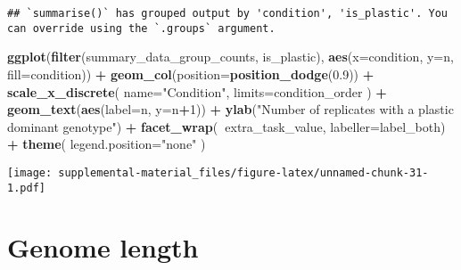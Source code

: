\documentclass[]{book}
\newenvironment{Shaded}{\begin{snugshade}}{\end{snugshade}}
\newcommand{\DataTypeTok}[1]{\textcolor[rgb]{0.13,0.29,0.53}{#1}}
\newcommand{\DecValTok}[1]{\textcolor[rgb]{0.00,0.00,0.81}{#1}}
\newcommand{\FloatTok}[1]{\textcolor[rgb]{0.00,0.00,0.81}{#1}}
\newcommand{\KeywordTok}[1]{\textcolor[rgb]{0.13,0.29,0.53}{\textbf{#1}}}
\newcommand{\NormalTok}[1]{#1}
\newcommand{\OperatorTok}[1]{\textcolor[rgb]{0.81,0.36,0.00}{\textbf{#1}}}
\newcommand{\StringTok}[1]{\textcolor[rgb]{0.31,0.60,0.02}{#1}}
\begin{document}
\begin{verbatim}
## `summarise()` has grouped output by 'condition', 'is_plastic'. You can override using the `.groups` argument.
\end{verbatim}

\begin{Shaded}
\begin{Highlighting}[]
\KeywordTok{ggplot}\NormalTok{(}\KeywordTok{filter}\NormalTok{(summary_data_group_counts, is_plastic), }\KeywordTok{aes}\NormalTok{(}\DataTypeTok{x=}\NormalTok{condition, }\DataTypeTok{y=}\NormalTok{n, }\DataTypeTok{fill=}\NormalTok{condition)) }\OperatorTok{+}
\StringTok{  }\KeywordTok{geom_col}\NormalTok{(}\DataTypeTok{position=}\KeywordTok{position_dodge}\NormalTok{(}\FloatTok{0.9}\NormalTok{)) }\OperatorTok{+}
\StringTok{  }\KeywordTok{scale_x_discrete}\NormalTok{(}
    \DataTypeTok{name=}\StringTok{"Condition"}\NormalTok{,}
    \DataTypeTok{limits=}\NormalTok{condition_order}
\NormalTok{  ) }\OperatorTok{+}
\StringTok{  }\KeywordTok{geom_text}\NormalTok{(}\KeywordTok{aes}\NormalTok{(}\DataTypeTok{label=}\NormalTok{n, }\DataTypeTok{y=}\NormalTok{n}\OperatorTok{+}\DecValTok{1}\NormalTok{)) }\OperatorTok{+}
\StringTok{  }\KeywordTok{ylab}\NormalTok{(}\StringTok{"Number of replicates with a plastic dominant genotype"}\NormalTok{) }\OperatorTok{+}
\StringTok{  }\KeywordTok{facet_wrap}\NormalTok{(}\OperatorTok{~}\NormalTok{extra_task_value, }\DataTypeTok{labeller=}\NormalTok{label_both) }\OperatorTok{+}
\StringTok{  }\KeywordTok{theme}\NormalTok{(}
    \DataTypeTok{legend.position=}\StringTok{"none"}
\NormalTok{  )}
\end{Highlighting}
\end{Shaded}

\texttt{[image: supplemental-material\_files/figure-latex/unnamed-chunk-31-1.pdf]}

\hypertarget{genome-length-1}{%
\section{Genome length}\label{genome-length-1}}
\end{document}
